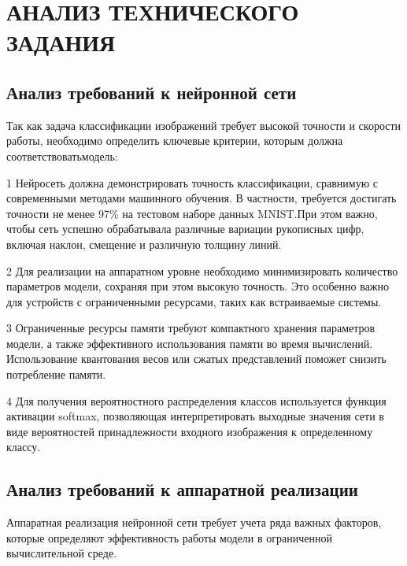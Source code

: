 \chapter[Анализ технического задания]{АНАЛИЗ ТЕХНИЧЕСКОГО ЗАДАНИЯ}

\section{Анализ требований к нейронной сети}
\hspace*{12.5 mm}Так как задача классификации изображений требует высокой 
точности и скорости работы, необходимо определить ключевые критерии, которым 
должна соответствоватьмодель:

  1 Нейросеть должна демонстрировать точность классификации, сравнимую с 
современными методами машинного обучения. В частности, требуется достигать 
точности не менее 97\% на тестовом наборе данных MNIST.\@ При этом важно, чтобы
сеть успешно обрабатывала различные вариации рукописных цифр, включая наклон, 
смещение и различную толщину линий.

  2 Для реализации на аппаратном уровне необходимо минимизировать количество 
параметров модели, сохраняя при этом высокую точность. Это особенно важно для 
устройств с ограниченными ресурсами, таких как встраиваемые системы.

  3 Ограниченные ресурсы памяти требуют компактного хранения параметров модели,
а также эффективного использования памяти во время вычислений. Использование 
квантования весов или сжатых представлений поможет снизить потребление памяти.

  4 Для получения вероятностного распределения классов используется функция 
активации softmax, позволяющая интерпретировать выходные значения сети в виде 
вероятностей принадлежности входного изображения к определенному классу.

\section{Анализ требований к аппаратной реализации}
\hspace*{12.5 mm}Аппаратная реализация нейронной сети требует учета ряда важных
факторов, которые определяют эффективность работы модели в ограниченной 
вычислительной среде.

